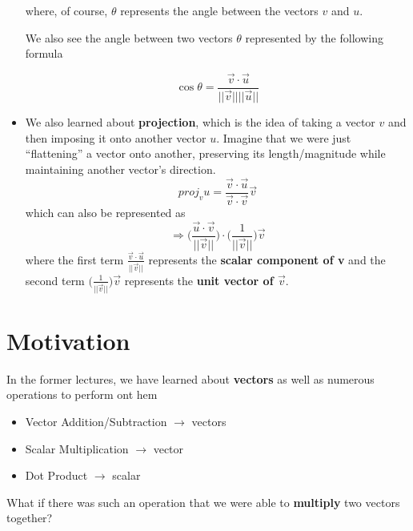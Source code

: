 \documentclass{report}
\begin{document}
\begin{sloppypar}
\begin{itemize}
        where, of course, $ \theta $ represents the angle
        between the vectors $ v $ and $ u $.
        \\
        \par We also see the angle between two vectors
        $ \theta $ represented by the following formula

        \[ \cos{\theta} =
        \frac{\vec{v} \cdot \vec{u}}{||\vec{v}|| ||\vec{u}||}
        \]

  \item We also learned about \textbf{projection},
        which is the idea of taking a vector $ v $ and
        then imposing it onto another vector $ u $.
        Imagine that we were just ``flattening'' a vector
        onto another, preserving its length/magnitude
        while maintaining another vector's direction.
        \[ proj_{v}u =
        \frac{\vec{v} \cdot \vec{u}}{\vec{v} \cdot \vec{v}} \vec{v} \]
        which can also be represented as
        \[ \Rightarrow \Biggr(
        \frac{\vec{u} \cdot \vec{v}}{||\vec{v}||}
        \Biggr)
        \cdot
        \Biggr(
        \frac{1}{||\vec{v}||}
        \Biggr) \vec{v}
        \]
        where the first term $ \frac{\vec{v} \cdot \vec{u}}{||\vec{v}||}$ represents the
        \textbf{scalar component of v} and the second
        term $ \Biggr( \frac{1}{||\vec{v}||}\Biggr) \vec{v} $
        represents the \textbf{unit vector of $ \vec{v} $}.


\end{itemize}

\section{Motivation}
In the former lectures, we have learned about
\textbf{vectors} as well as numerous operations
to perform ont hem

\begin{itemize}
  \item Vector Addition/Subtraction $ \rightarrow $ vectors
  \item Scalar Multiplication $ \rightarrow $ vector
  \item Dot Product $ \rightarrow $ scalar
\end{itemize}

What if there was such an operation that we were able
to \textbf{multiply} two vectors together?


\end{sloppypar}
\end{document}
